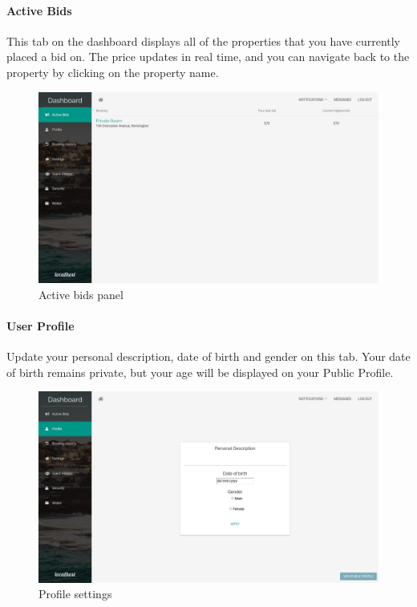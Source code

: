 \paragraph{Active Bids}
This tab on the dashboard displays all of the properties that you have currently
placed a bid on. The price updates in real time, and you can navigate back to
the property by clicking on the property name.
\begin{figure}[!h]
  \includegraphics[width=\linewidth]{assets/userManual/activeBids.png}
  \caption{Active bids panel}
  \label{fig:activeBids}
\end{figure}

\paragraph{User Profile}
Update your personal description, date of birth and gender on this tab. Your
date of birth remains private, but your age will be displayed on your Public
Profile.
\begin{figure}[!h]
  \includegraphics[width=\linewidth]{assets/userManual/profile.png}
  \caption{Profile settings}
  \label{fig:userProfile}
\end{figure}

